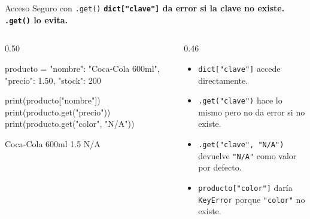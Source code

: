 \documentclass[aspectratio=169, 11pt]{beamer}
\begin{document}
\begin{frame}[fragile,shrink=30]{Acceso Seguro con \texttt{.get()}}
  \vspace{-6pt}
  {\small\color{arcaDark}\bfseries
    \texttt{dict["clave"]} da error si la clave no existe.
    \texttt{.get()} lo evita.}

  \vspace{4pt}
  \begin{columns}[T]
    \begin{column}{0.50\textwidth}
      \begin{pyblock}
producto = {
    "nombre": "Coca-Cola 600ml",
    "precio": 1.50,
    "stock": 200
}

print(producto["nombre"])
print(producto.get("precio"))
print(producto.get("color", "N/A"))
      \end{pyblock}
      \vspace{-2pt}
      \begin{outputblock}
Coca-Cola 600ml
1.5
N/A
      \end{outputblock}
    \end{column}

    \begin{column}{0.46\textwidth}
      \vspace{2pt}
      {\scriptsize\color{textMuted}
      \begin{itemize}\setlength{\itemsep}{4pt}
        \item[{\color{arcaRed}\scriptsize\faArrowRight}]
          \texttt{dict["clave"]} accede directamente.
        \item[{\color{arcaRed}\scriptsize\faArrowRight}]
          \texttt{.get("clave")} hace lo mismo
          pero no da error si no existe.
        \item[{\color{arcaRed}\scriptsize\faArrowRight}]
          \texttt{.get("clave", "N/A")} devuelve
          \texttt{"N/A"} como valor por defecto.
        \item[{\color{arcaRed}\scriptsize\faExclamationTriangle}]
          \texttt{producto["color"]} daría
          \texttt{KeyError} porque \texttt{"color"}
          no existe.
      \end{itemize}
      }
    \end{column}
  \end{columns}
\end{frame}
\end{document}
